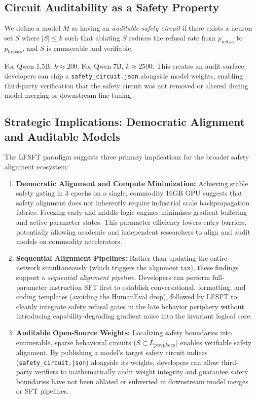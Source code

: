 \documentclass[11pt]{article}
\begin{document}
\subsection{Circuit Auditability as a Safety Property}

We define a model $M$ as having an \textit{auditable safety circuit} if there exists a neuron set $S$ where $|S| \le k$ such that ablating $S$ reduces the refusal rate from $p_{\text{refuse}}$ to $p_{\text{bypass}}$, and $S$ is enumerable and verifiable.

For Qwen 1.5B, $k \approx 200$. For Qwen 7B, $k \approx 2500$. This creates an audit surface: developers can ship a \texttt{safety\_circuit.json} alongside model weights, enabling third-party verification that the safety circuit was not removed or altered during model merging or downstream fine-tuning.

\subsection{Strategic Implications: Democratic Alignment and Auditable Models}

The LFSFT paradigm suggests three primary implications for the broader safety alignment ecosystem:
\begin{enumerate}
    \item \textbf{Democratic Alignment and Compute Minimization:} Achieving stable safety gating in 3 epochs on a single, commodity 16GB GPU suggests that safety alignment does not inherently require industrial scale backpropagation fabrics. Freezing early and middle logic engines minimizes gradient buffering and active parameter states. This parameter efficiency lowers entry barriers, potentially allowing academic and independent researchers to align and audit models on commodity accelerators.
    \item \textbf{Sequential Alignment Pipelines:} Rather than updating the entire network simultaneously (which triggers the alignment tax), these findings support a \textit{sequential alignment pipeline}. Developers can perform full-parameter instruction SFT first to establish conversational, formatting, and coding templates (avoiding the HumanEval drop), followed by LFSFT to cleanly integrate safety refusal gates in the late behavior periphery without introducing capability-degrading gradient noise into the invariant logical core.
    \item \textbf{Auditable Open-Source Weights:} Localizing safety boundaries into enumerable, sparse behavioral circuits ($S \subset L_{periphery}$) enables verifiable safety alignment. By publishing a model's target safety circuit indices (\texttt{safety\_circuit.json}) alongside its weights, developers can allow third-party verifiers to mathematically audit weight integrity and guarantee safety boundaries have not been ablated or subverted in downstream model merges or SFT pipelines.
\end{enumerate}
\end{document}
